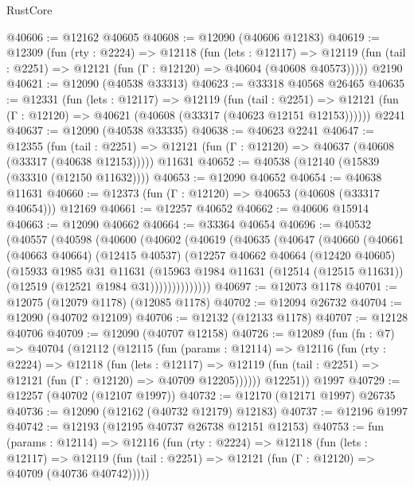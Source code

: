 \begin{lexlean}{RustCore}
\begin{coremodule}
@40606 := @12162 @40605
@40608 := @12090 (@40606 @12183)
@40619 := @12309
    (fun (rty : @2224) =>
    @12118
      (fun (lets : @12117) =>
      @12119 (fun (tail : @2251) => @12121 (fun (Γ : @12120) => @40604 (@40608 @40573)))))
    @2190
@40621 := @12090 (@40538 @33313)
@40623 := @33318 @40568 @26465
@40635 := @12331
    (fun (lets : @12117) =>
    @12119
      (fun (tail : @2251) =>
      @12121 (fun (Γ : @12120) => @40621 (@40608 (@33317 (@40623 @12151 @12153))))))
    @2241
@40637 := @12090 (@40538 @33335)
@40638 := @40623 @2241
@40647 := @12355
    (fun (tail : @2251) => @12121 (fun (Γ : @12120) => @40637 (@40608 (@33317 (@40638 @12153)))))
    @11631
@40652 := @40538 (@12140 (@15839 (@33310 (@12150 @11632))))
@40653 := @12090 @40652
@40654 := @40638 @11631
@40660 := @12373 (fun (Γ : @12120) => @40653 (@40608 (@33317 @40654))) @12169
@40661 := @12257 @40652
@40662 := @40606 @15914
@40663 := @12090 @40662
@40664 := @33364 @40654
@40696 := @40532
    (@40557
      (@40598
        (@40600
          (@40602
            (@40619
              (@40635
                (@40647
                  (@40660
                    (@40661
                      (@40663 @40664)
                      (@12415 @40537)
                      (@12257
                        @40662
                        @40664
                        (@12420 @40605)
                        (@15933
                          @1985
                          @31
                          @11631
                          (@15963
                            @1984
                            @11631
                            (@12514 (@12515 @11631))
                            (@12519 (@12521 @1984 @31))))))))))))))
@40697 := @12073 @1178
@40701 := @12075 (@12079 @1178) (@12085 @1178)
@40702 := @12094 @26732
@40704 := @12090 (@40702 @12109)
@40706 := @12132 (@12133 @1178)
@40707 := @12128 @40706
@40709 := @12090 (@40707 @12158)
@40726 := @12089
    (fun (fn : @7) =>
    @40704
      (@12112
        (@12115
          (fun (params : @12114) =>
          @12116
            (fun (rty : @2224) =>
            @12118
              (fun (lets : @12117) =>
              @12119 (fun (tail : @2251) => @12121 (fun (Γ : @12120) => @40709 @12205))))))
        @12251))
    @1997
@40729 := @12257 (@40702 (@12107 @1997))
@40732 := @12170 (@12171 @1997) @26735
@40736 := @12090 (@12162 (@40732 @12179) @12183)
@40737 := @12196 @1997
@40742 := @12193 (@12195 @40737 @26738 @12151 @12153)
@40753 := fun (params : @12114) =>
  @12116
    (fun (rty : @2224) =>
    @12118
      (fun (lets : @12117) =>
      @12119 (fun (tail : @2251) => @12121 (fun (Γ : @12120) => @40709 (@40736 @40742)))))

\end{coremodule}
\end{lexlean}
